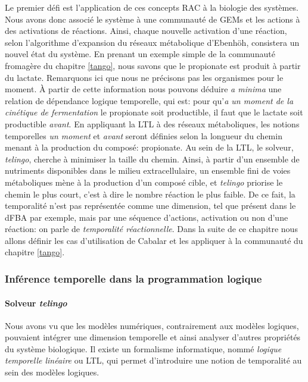 \documentclass[../main.tex]{subfiles}
\begin{document}
Le premier défi est l'application de ces concepts RAC à la biologie des systèmes. Nous avons donc associé le système à une communauté de GEMs et les actions à des activations de réactions. Ainsi, chaque nouvelle activation d'une réaction, selon l'algorithme d'expansion du réseaux métabolique d'Ebenhöh, consistera un nouvel état du système. En prenant un exemple simple de la communauté fromagère du chapitre \ref{tango}, nous savons que le propionate est produit à partir du lactate. Remarquons ici que nous ne précisons pas les organismes pour le moment. À partir de cette information nous pouvons déduire \textit{a minima} une relation de dépendance logique temporelle, qui est: pour qu'\textit{a un moment de la cinétique de fermentation} le propionate soit productible, il faut que le lactate soit productible \textit{avant}. En appliquant la LTL à des réseaux métaboliques, les notions temporelles \textit{un moment} et \textit{avant} seront définies selon la longueur du chemin menant à la production du composé: propionate. Au sein de la LTL, le solveur,  \textit{telingo}, cherche à minimiser la taille du chemin. Ainsi, à partir d'un ensemble de nutriments disponibles dans le milieu extracellulaire, un ensemble fini de voies métaboliques mène à la production d'un composé cible, et \textit{ \textit{ \textit{telingo}}} priorise le chemin le plus court, c'est à dire le nombre réaction le plus faible. De ce fait, la temporalité n'est pas représentée comme une dimension, tel que présent dans le dFBA par exemple, mais par une séquence d'actions, activation ou non d'une réaction: on parle de \textit{temporalité réactionnelle}. Dans la suite de ce chapitre nous allons définir les cas d'utilisation de Cabalar et les appliquer à la communauté du chapitre \ref{tango}.


\subsubsection*{Inférence temporelle dans la programmation logique}

\paragraph*{Solveur \textit{ \textit{ \textit{telingo}}}}
Nous avons vu que les modèles numériques, contrairement aux modèles logiques, pouvaient intégrer une dimension temporelle et ainsi analyser d'autres propriétés du système biologique. Il existe un formalisme informatique, nommé \textit{logique temporelle linéaire} ou LTL, qui permet d'introduire une notion de temporalité au sein des modèles logiques. 
\end{document}
